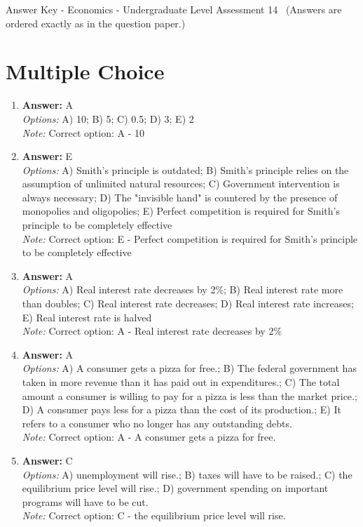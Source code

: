 \documentclass[12pt]{article}
\begin{document}
\begin{center}
Answer Key - Economics - Undergraduate Level Assessment 14 \
\small (Answers are ordered exactly as in the question paper.)
\end{center}

\section*{Multiple Choice}
\begin{enumerate}[label=\arabic*.]
\item \textbf{Answer:} A
\\ \textit{Options:} A) 10; B) 5; C) 0.5; D) 3; E) 2
\\ \textit{Note:} Correct option: A - 10
\item \textbf{Answer:} E
\\ \textit{Options:} A) Smith's principle is outdated; B) Smith's principle relies on the assumption of unlimited natural resources; C) Government intervention is always necessary; D) The "invisible hand" is countered by the presence of monopolies and oligopolies; E) Perfect competition is required for Smith's principle to be completely effective
\\ \textit{Note:} Correct option: E - Perfect competition is required for Smith's principle to be completely effective
\item \textbf{Answer:} A
\\ \textit{Options:} A) Real interest rate decreases by 2\%; B) Real interest rate more than doubles; C) Real interest rate decreases; D) Real interest rate increases; E) Real interest rate is halved
\\ \textit{Note:} Correct option: A - Real interest rate decreases by 2\%
\item \textbf{Answer:} A
\\ \textit{Options:} A) A consumer gets a pizza for free.; B) The federal government has taken in more revenue than it has paid out in expenditures.; C) The total amount a consumer is willing to pay for a pizza is less than the market price.; D) A consumer pays less for a pizza than the cost of its production.; E) It refers to a consumer who no longer has any outstanding debts.
\\ \textit{Note:} Correct option: A - A consumer gets a pizza for free.
\item \textbf{Answer:} C
\\ \textit{Options:} A) unemployment will rise.; B) taxes will have to be raised.; C) the equilibrium price level will rise.; D) government spending on important programs will have to be cut.
\\ \textit{Note:} Correct option: C - the equilibrium price level will rise.
\end{enumerate}
\end{document}
